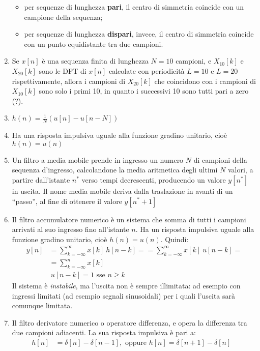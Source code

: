 \documentclass[
]{article}
\providecommand{\tightlist}{%
  \setlength{\itemsep}{0pt}\setlength{\parskip}{0pt}}
\begin{document}
\begin{enumerate}
  \begin{itemize}
  \tightlist
  \item
    per sequenze di lunghezza \textbf{pari}, il centro di simmetria
    coincide con un campione della sequenza;
  \item
    per sequenze di lunghezza \textbf{dispari}, invece, il centro di
    simmetria coincide con un punto equidistante tra due campioni.
  \end{itemize}
\item
  Se \(x[n]\) è una sequenza finita di lunghezza \(N=10\) campioni, e
  \(X_{10}[k]\) e \(X_{20}[k]\) sono le DFT di \(x[n]\) calcolate con
  periodicità \(L=10\) e \(L=20\) rispettivamente, allora i campioni di
  \(X_{20}[k]\) che coincidono con i campioni di \(X_{10}[k]\) sono solo
  i primi 10, in quanto i successivi 10 sono tutti pari a zero (?).
\item
  \(h(n) = \frac{1}{N}(u[n]-u[n-N])\)
\item
  Ha una risposta impulsiva uguale alla funzione gradino unitario, cioè
  \(h(n) = u(n)\)
\item
  Un filtro a media mobile prende in ingresso un numero \(N\) di
  campioni della sequenza d'ingresso, calcolandone la media aritmetica
  degli ultimi \(N\) valori, a partire dall'istante \(n^{*}\) verso
  tempi decrescenti, producendo un valore \(y[n^{*}]\) in uscita. Il
  nome media mobile deriva dalla traslazione in avanti di un ``passo'',
  al fine di ottenere il valore \(y[n^{*}+1]\)
\item
  Il filtro accumulatore numerico è un sistema che somma di tutti i
  campioni arrivati al suo ingresso fino all'istante \(n\). Ha un
  risposta impulsiva uguale alla funzione gradino unitario, cioè
  \(h(n)=u(n)\). Quindi: \begin{align*}
  y[n] &=\sum_{k=-\infty}^{\infty}x[k] \ h[n-k] = =\sum_{k=-\infty}^{\infty}x[k] \ u[n-k] = \\
  & =\sum_{k=-\infty}^{n}x[k] \\ &\ u[n-k] = 1 \text{ sse } n\geq k
  \end{align*} Il sistema è \emph{instabile}, ma l'uscita non è sempre
  illimitata: ad esempio con ingressi limitati (ad esempio segnali
  sinusoidali) per i quali l'uscita sarà comunque limitata.
\item
  Il filtro derivatore numerico o operatore differenza, e opera la
  differenza tra due campioni adiacenti. La sua risposta impulsiva è
  pari a: \begin{align*}
  h[n] &= \delta[n] - \delta[n-1], \text{ oppure } h[n]= \delta[n+1]-\delta[n]& \\

\end{align*}
\end{enumerate}
\end{document}
